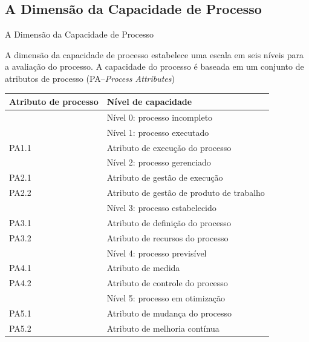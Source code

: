 \subsection{A Dimensão da Capacidade de Processo}


\begin{frame}{A Dimensão da Capacidade de Processo}
  
  A dimensão da capacidade de processo estabelece uma escala em seis níveis para 
  a avaliação do processo. A capacidade do processo é baseada em um conjunto de 
  atributos de processo (PA--{\em Process Attributes})

\scriptsize
\bigskip
\begin{center}
  \begin{tabular}[h]{l|l}\hline
    \bf Atributo de processo & \bf Nível de capacidade \\\hline
    & Nível 0: processo incompleto\\\hline
    & Nível 1: processo executado\\
    PA1.1 & \hspace{.5cm} Atributo de execução do processo\\\hline
    & Nível 2: processo gerenciado\\
    PA2.1 & \hspace{.5cm} Atributo de gestão de execução \\
    PA2.2 & \hspace{.5cm} Atributo de gestão de produto de trabalho \\\hline
    & Nível 3: processo estabelecido\\
    PA3.1 & \hspace{.5cm} Atributo de definição do processo \\
    PA3.2 & \hspace{.5cm} Atributo de recursos do processo \\\hline
    & Nível 4: processo previsível\\
    PA4.1 & \hspace{.5cm} Atributo de medida \\
    PA4.2 & \hspace{.5cm} Atributo de controle do processo \\\hline
                            & Nível 5: processo em otimização\\
    PA5.1 & \hspace{.5cm} Atributo de mudança do processo \\
    PA5.2 & \hspace{.5cm} Atributo de melhoria contínua \\\hline
  \end{tabular}
\end{center}
\end{frame}



